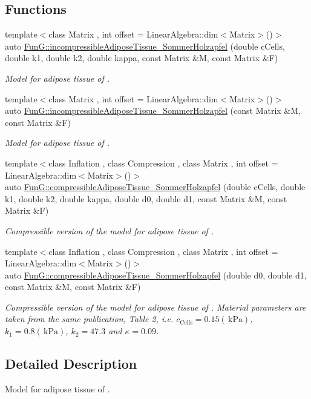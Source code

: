 \subsection*{Functions}
\begin{DoxyCompactItemize}
\item 
{\footnotesize template$<$class Matrix , int offset = Linear\-Algebra\-::dim$<$\-Matrix$>$()$>$ }\\auto \hyperlink{group__Biomechanics_gac269eefc1abb994044e1634c20a98061}{Fun\-G\-::incompressible\-Adipose\-Tissue\-\_\-\-Sommer\-Holzapfel} (double c\-Cells, double k1, double k2, double kappa, const Matrix \&M, const Matrix \&F)
\begin{DoxyCompactList}\small\item\em Model for adipose tissue of \cite{Sommer2013}. \end{DoxyCompactList}\item 
{\footnotesize template$<$class Matrix , int offset = Linear\-Algebra\-::dim$<$\-Matrix$>$()$>$ }\\auto \hyperlink{group__Biomechanics_ga01ab128bcf179f4431b0270179af9e20}{Fun\-G\-::incompressible\-Adipose\-Tissue\-\_\-\-Sommer\-Holzapfel} (const Matrix \&M, const Matrix \&F)
\begin{DoxyCompactList}\small\item\em Model for adipose tissue of \cite{Sommer2013}. \end{DoxyCompactList}\item 
{\footnotesize template$<$class Inflation , class Compression , class Matrix , int offset = Linear\-Algebra\-::dim$<$\-Matrix$>$()$>$ }\\auto \hyperlink{group__Biomechanics_ga5c3388564c0420b62e58f48c739d27f1}{Fun\-G\-::compressible\-Adipose\-Tissue\-\_\-\-Sommer\-Holzapfel} (double c\-Cells, double k1, double k2, double kappa, double d0, double d1, const Matrix \&M, const Matrix \&F)
\begin{DoxyCompactList}\small\item\em Compressible version of the model for adipose tissue of \cite{Sommer2013}. \end{DoxyCompactList}\item 
{\footnotesize template$<$class Inflation , class Compression , class Matrix , int offset = Linear\-Algebra\-::dim$<$\-Matrix$>$()$>$ }\\auto \hyperlink{group__Biomechanics_ga27bb3f7c579ce8c21a69ea4d4d0169d7}{Fun\-G\-::compressible\-Adipose\-Tissue\-\_\-\-Sommer\-Holzapfel} (double d0, double d1, const Matrix \&M, const Matrix \&F)
\begin{DoxyCompactList}\small\item\em Compressible version of the model for adipose tissue of \cite{Sommer2013}. Material parameters are taken from the same publication, Table 2, i.\-e. $c_\mathrm{Cells}=0.15 (\,\mathrm{kPa})$, $k_1=0.8 (\,\mathrm{kPa})$, $k_2=47.3$ and $\kappa=0.09$. \end{DoxyCompactList}\end{DoxyCompactItemize}


\subsection{Detailed Description}
Model for adipose tissue of \cite{Sommer2013}. 